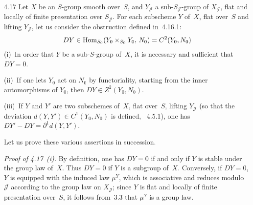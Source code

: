 \begin{lemma}{4.17}\label{III.4.17}
{\renewcommand{\thefootnote}{(109)}}
Let \(X\) be an \(S\)-group smooth over~\(S\), and \(Y_{\mathcal{J}}\) a
sub-\(S_{\mathcal{J}}\)-group of \(X_{\mathcal{J}}\), flat and locally of finite
presentation over \(S_{\mathcal{J}}\). For each subscheme \(Y\) of~\(X\), flat
over~\(S\) and lifting \(Y_{\mathcal{J}}\),
let us consider the obstruction defined in~4.16.1:
\[
DY\in\operatorname{Hom}_{S_0}(Y_0\times_{S_0}Y_0,\,N_0)=C^{2}(Y_0,N_0)
\]
(i)~In order that \(Y\) be a sub-\(S\)-group of~\(X\), it is necessary and
sufficient that \(DY=0\).

(ii)~If one lets \(Y_0\) act on \(N_0\) by functoriality, starting from the
inner automorphisms of \(Y_0\), then \(DY\in Z^{2}(Y_0,N_0)\).

(iii)~If \(Y\) and \(Y'\) are two subschemes of~\(X\), flat over~\(S\), lifting
\(Y_{\mathcal{J}}\) (so that the deviation \(d(Y,Y')\in C^{1}(Y_0,N_0)\) is
defined, \cf~4.5.1), one has \(DY'-DY=\partial^{1}d(Y,Y')\).%
{\renewcommand{\thefootnote}{(110)}}
\end{lemma}

Let us prove these various assertions in succession.

\label{III.4.18}
{\itshape Proof of 4.17~(i).}
By definition, one has \(DY=0\) if and only if \(Y\) is stable under the group
law of~\(X\). Thus \(DY=0\) if \(Y\) is a subgroup of~\(X\). Conversely, if
\(DY=0\), \(Y\) is equipped with the induced law \(\mu^{Y}\), which is
associative and reduces modulo \(\mathcal{J}\) according to the group law
on \(X_{\mathcal{J}}\); since \(Y\) is flat and locally of finite presentation
over~\(S\), it follows from~3.3 that \(\mu^{Y}\) is a group law.

